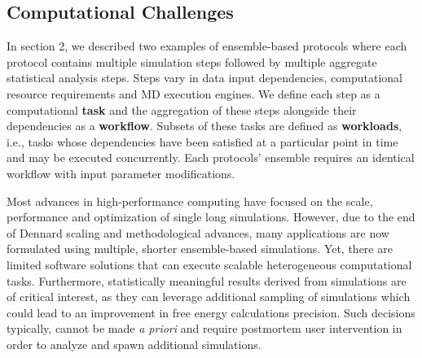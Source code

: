 \subsection{Computational Challenges}

 In section 2, we described
two examples of ensemble-based protocols where each protocol contains multiple
simulation steps followed by multiple aggregate statistical analysis steps.
Steps vary in data input dependencies, computational resource requirements and
MD execution engines. We define each step as a computational \textbf{task} and
the aggregation of these steps alongside their dependencies as a
\textbf{workflow}. Subsets of these tasks are defined as \textbf{workloads},
i.e., tasks whose dependencies have been satisfied at a particular point in
time and may be executed concurrently. Each protocols' ensemble requires an
identical workflow with input parameter modifications.

Most advances in high-performance computing have focused on the scale,
performance and optimization of single long simulations. However, due to the
end of Dennard scaling and methodological advances, many applications are now
formulated using multiple, shorter ensemble-based simulations. Yet, there are
limited software solutions that can execute scalable heterogeneous
computational tasks. Furthermore, statistically meaningful results derived
from simulations are of critical interest, as they can leverage additional
sampling of simulations which could lead to an improvement in free energy
calculations precision. Such decisions typically, cannot be made {\it a
priori} and require postmortem user intervention in order to analyze and spawn
additional simulations.



